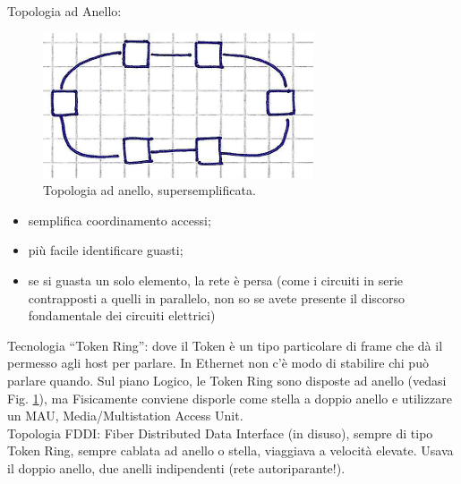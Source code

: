 \noindent Topologia ad Anello:
\begin{figure} [ht]
    \centering
    \includegraphics[width=0.5\linewidth]{Figures/06/ringtop.png}
    \caption{Topologia ad anello, supersemplificata.}
    \label{fig:06tknrng}
\end{figure}

\begin{itemize}
    \item semplifica coordinamento accessi;
    \item più facile identificare guasti;
    \item se si guasta un solo elemento, la rete è persa (come i circuiti in serie contrapposti a quelli in parallelo, non so se avete presente il discorso fondamentale dei circuiti elettrici)
\end{itemize}
\noindent Tecnologia ``Token Ring'': dove il Token è un tipo particolare di frame che dà il permesso agli host per parlare. In Ethernet non c'è modo di stabilire chi può parlare quando. Sul piano Logico, le Token Ring sono disposte ad anello (vedasi Fig. \ref{fig:06tknrng}), ma Fisicamente conviene disporle come stella a doppio anello e utilizzare un MAU, Media/Multistation Access Unit.\\
\noindent Topologia FDDI: Fiber Distributed Data Interface (in disuso), sempre di tipo Token Ring, sempre cablata ad anello o stella, viaggiava a velocità elevate. Usava il doppio anello, due anelli indipendenti (rete autoriparante!).\\

